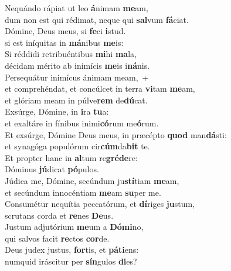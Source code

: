\evenverse Nequándo rápiat ut leo \textbf{á}nimam \textbf{me}am,~\*\\
\evenverse dum non est qui rédimat, neque qui \textbf{sal}vum \textbf{fá}ciat.\\
\oddverse Dómine, Deus meus, si \textbf{fe}ci \textbf{i}stud.~\*\\
\oddverse si est iníquitas in \textbf{má}nibus \textbf{me}is:\\
\evenverse Si réddidi retribuéntibus \textbf{mi}hi \textbf{ma}la,~\*\\
\evenverse décidam mérito ab inimícis \textbf{me}is i\textbf{ná}nis.\\
\oddverse Persequátur inimícus ánimam meam,~+\\
\oddverse  et comprehéndat, et concúlcet in terra \textbf{vi}tam \textbf{me}am,~\*\\
\oddverse et glóriam meam in púlve\textbf{rem} de\textbf{dú}cat.\\
\evenverse Exsúrge, Dómine, in \textbf{i}ra \textbf{tu}a:~\*\\
\evenverse et exaltáre in fínibus inimi\textbf{có}rum me\textbf{ó}rum.\\
\oddverse Et exsúrge, Dómine Deus meus, in præcépto \textbf{quod} man\textbf{dá}sti:~\*\\
\oddverse et synagóga populórum cir\textbf{cúm}da\textbf{bit} te.\\
\evenverse Et propter hanc in \textbf{al}tum re\textbf{gré}\textbf{de}re:~\*\\
\evenverse Dóminus \textbf{jú}dicat \textbf{pó}pulos.\\
\oddverse Júdica me, Dómine, secúndum ju\textbf{stí}tiam \textbf{me}am,~\*\\
\oddverse et secúndum innocéntiam \textbf{me}am \textbf{su}per me.\\
\evenverse Consumétur nequítia peccatórum, et \textbf{dí}riges \textbf{ju}stum,~\*\\
\evenverse scrutans corda et \textbf{re}nes \textbf{De}us.\\
\oddverse Justum adjutórium \textbf{me}um a \textbf{Dó}\textbf{mi}no,~\*\\
\oddverse qui salvos facit \textbf{re}ctos \textbf{cor}de.\\
\evenverse Deus judex justus, \textbf{for}tis, et \textbf{pá}\textbf{ti}ens:~\*\\
\evenverse numquid iráscitur per \textbf{sín}gulos \textbf{di}es?\\

